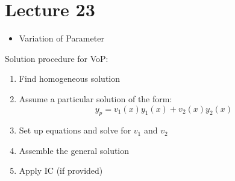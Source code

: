 \chapter*{Lecture 23}
\begin{recall}{}{}
\begin{itemize}
\item Variation of Parameter
\end{itemize}
\end{recall}


Solution procedure for VoP:
\begin{enumerate}
\item Find homogeneous solution
\item Assume a particular solution of the form:
\begin {equation*}
y_p=v_1(x)y_1(x) + v_2(x)y_2(x)
\end {equation*}
\item Set up equations and solve for $v_1$ and $v_2$
\item Assemble the general solution
\item Apply IC (if provided)
\end{enumerate}

